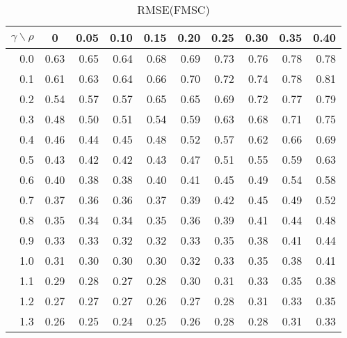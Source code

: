\documentclass[12pt]{article}
\begin{document}
%
\begin{table}[!tbp]
\caption{RMSE(FMSC)}
 \begin{center}
 \begin{tabular}{r|rrrrrrrrr}\hline\hline
\multicolumn{1}{c|}{$\gamma\backslash\rho$}&\multicolumn{1}{c}{0}&\multicolumn{1}{c}{0.05}&\multicolumn{1}{c}{0.10}&\multicolumn{1}{c}{0.15}&\multicolumn{1}{c}{0.20}&\multicolumn{1}{c}{0.25}&\multicolumn{1}{c}{0.30}&\multicolumn{1}{c}{0.35}&\multicolumn{1}{c}{0.40}\tabularnewline
\hline

0.0&0.63&0.65&0.64&0.68&0.69&0.73&0.76&0.78&0.78\tabularnewline
0.1&0.61&0.63&0.64&0.66&0.70&0.72&0.74&0.78&0.81\tabularnewline
0.2&0.54&0.57&0.57&0.65&0.65&0.69&0.72&0.77&0.79\tabularnewline
0.3&0.48&0.50&0.51&0.54&0.59&0.63&0.68&0.71&0.75\tabularnewline
0.4&0.46&0.44&0.45&0.48&0.52&0.57&0.62&0.66&0.69\tabularnewline
0.5&0.43&0.42&0.42&0.43&0.47&0.51&0.55&0.59&0.63\tabularnewline
0.6&0.40&0.38&0.38&0.40&0.41&0.45&0.49&0.54&0.58\tabularnewline
0.7&0.37&0.36&0.36&0.37&0.39&0.42&0.45&0.49&0.52\tabularnewline
0.8&0.35&0.34&0.34&0.35&0.36&0.39&0.41&0.44&0.48\tabularnewline
0.9&0.33&0.33&0.32&0.32&0.33&0.35&0.38&0.41&0.44\tabularnewline
1.0&0.31&0.30&0.30&0.30&0.32&0.33&0.35&0.38&0.41\tabularnewline
1.1&0.29&0.28&0.27&0.28&0.30&0.31&0.33&0.35&0.38\tabularnewline
1.2&0.27&0.27&0.27&0.26&0.27&0.28&0.31&0.33&0.35\tabularnewline
1.3&0.26&0.25&0.24&0.25&0.26&0.28&0.28&0.31&0.33\tabularnewline
\hline
\end{tabular}

\end{center}

\end{table}
\end{document}
